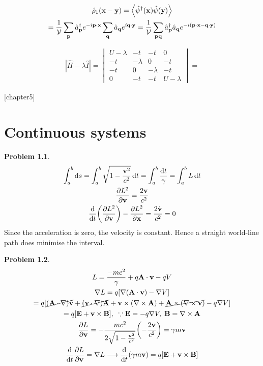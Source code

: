 \documentclass{report}
\theoremstyle{definition}
\begin{document}
\begin{chapter4}
	\begin{gather*}
		\hat{\rho}_1\pqty{\bf x - y} = \expval{\hat{\psi}^{\dagger}\pqty{\bf x}\hat{\psi}\pqty{\bf y}} \\
		= \frac{1}{\cal{V}}\sum_{\bf p}\hat{a}_{\bf p}^{\dagger}e^{-i\bf p\cdot x}\sum_{\bf q}\hat{a}_{\bf q}e^{i\bf q\cdot y} = \frac{1}{\cal{V}}\sum_{\bf pq}\hat{a}_{\bf p}^{\dagger}\hat{a}_{\bf q}e^{-i\pqty{\bf p\cdot x - q\cdot y}}
	\end{gather*}
\end{chapter4}

\begin{chapter4}
	\begin{gather*}
		|\hat{H} - \lambda\hat{I}| = \begin{vmatrix}
			U - \lambda & -t & -t & 0 \\
			-t & -\lambda & 0 & -t \\
			-t & 0 & -\lambda & -t \\
			0 & -t & -t & U - \lambda
		\end{vmatrix}
		= 
	\end{gather*}	
\end{chapter4}

\newtheorem{chapter5}{Problem}
[chapter5]
\chapter{Continuous systems}

\begin{chapter5}
	\begin{gather*}
		\int_a^b \dd{s} = \int_a^b \sqrt{1-\frac{{\bf v}^2}{c^2}} \dd{t} = \int_a^b \frac{\dd{t}}{\gamma} = \int_a^b L \dd{t} \\
		\pdv{L^2}{\bf v} = \frac{2\bf v}{c^2} \\
		\dv{t}\pqty{\pdv{L^2}{\bf v}} - \pdv{L^2}{\bf x} = \frac{2\dot{\bf v}}{c^2} = 0
	\end{gather*}
	Since the acceleration is zero, the velocity is constant. Hence a straight world-line path does minimise the interval.
\end{chapter5}

\begin{chapter5}
	\begin{gather*}
		L = \frac{-mc^2}{\gamma} + q{\bf A}\cdot{\bf v} - qV \\
		\nabla{L} = q\bqty{\nabla\pqty{{\bf A}\cdot {\bf v}} - \nabla V} \\
		= q\bqty{\cancel{\bf(A \cdot \nabla)v} + \cancel{\bf(v \cdot \nabla)A} + {\bf v \times (\nabla \times A)} + \cancel{\bf A \times (\nabla \times v)} - q\nabla V} \\
		= q\bqty{\bf E + v \times B},\;\;\because {\bf E} = -q\nabla V, \; \bf B = \nabla \times A\\
		\pdv{L}{\bf v} = -\frac{mc^2}{2\sqrt{1- \frac{{\bf v}^2}{c^2}}}\pqty{-\frac{2\bf v}{c^2}} = \gamma m {\bf v} \\
		\dv{t}\pdv{L}{\bf v} = \nabla L \longrightarrow \dv{t}(\gamma m \bf v) = q\bqty{\bf E + v \times B}
	\end{gather*}
\end{chapter5}
\end{document}
